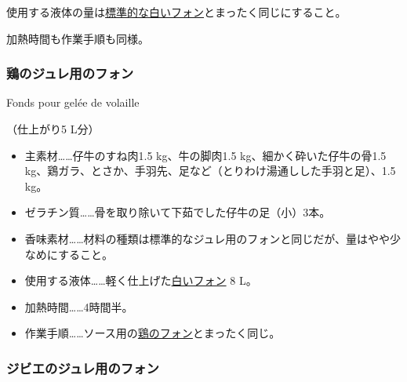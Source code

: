 \begin{recette}
使用する液体の量は\protect\hyperlink{fonds-blanc}{標準的な白いフォン}とまったく同じにすること。

加熱時間も作業手順も同様。

\atoaki{}

\hypertarget{fonds-pour-gelee-de-volaille}{%
\subsubsection{鶏のジュレ用のフォン}\label{fonds-pour-gelee-de-volaille}}

\begin{frsubenv}

Fonds pour gelée de volaille

\end{frsubenv}


（仕上がり5 L分）

\begin{itemize}
\item
  主素材\ldots{}\ldots{}仔牛のすね肉1.5 kg、牛の脚肉1.5
  kg、細かく砕いた仔牛の骨1.5
  kg、鶏ガラ、とさか、手羽先、足など（とりわけ湯通しした手羽と足）、1.5
  kg。
\item
  ゼラチン質\ldots{}\ldots{}骨を取り除いて下茹でした仔牛の足（小）3本。
\item
  香味素材\ldots{}\ldots{}材料の種類は標準的なジュレ用のフォンと同じだが、量はやや少なめにすること。
\item
  使用する液体\ldots{}\ldots{}軽く仕上げた\protect\hyperlink{fonds-blanc}{白いフォン}
  8 L。
\item
  加熱時間\ldots{}\ldots{}4時間半。
\item
  作業手順\ldots{}\ldots{}ソース用の\protect\hyperlink{fonds-de-volaille}{鶏のフォン}とまったく同じ。
\end{itemize}

\atoaki{}

\hypertarget{fonds-pour-gelee-de-gibier}{%
\subsubsection{ジビエのジュレ用のフォン}\label{fonds-pour-gelee-de-gibier}}


\end{recette}
